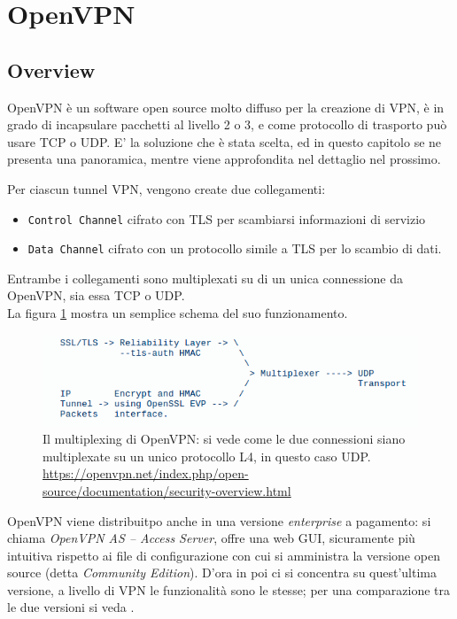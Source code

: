 \section{OpenVPN}
\subsection{Overview}
OpenVPN \cite{openvpn} è un software open source molto diffuso per la creazione di VPN,
è in grado di incapsulare pacchetti al livello 2 o 3, e come protocollo di trasporto
può usare TCP o UDP. E' la soluzione che è stata scelta, ed in questo capitolo
se ne presenta una panoramica, mentre viene approfondita nel dettaglio
nel prossimo.

Per ciascun tunnel VPN, vengono create due collegamenti:
\begin{itemize}
	\item \texttt{Control Channel} cifrato con TLS per scambiarsi informazioni di servizio
	\item \texttt{Data Channel} cifrato con un protocollo simile a TLS per lo scambio
	      di dati.
\end{itemize}
Entrambe i collegamenti sono multiplexati su di un unica connessione
da OpenVPN, sia essa TCP o UDP\cite{openvpn-security}.\\
La figura \ref{fig:openvpn-sec} mostra un semplice schema del suo funzionamento.\\
\begin{figure}[h!]
	\includegraphics[scale=0.4]{img/openvpn_sec}
	\caption[Il multiplexing di OpenVPN]{Il multiplexing di OpenVPN: si vede come
		le due connessioni siano multiplexate su un unico protocollo L4, in questo caso UDP.
		\url{https://openvpn.net/index.php/open-source/documentation/security-overview.html}}
	\label{fig:openvpn-sec}
\end{figure}
OpenVPN viene distribuitpo anche in una versione \textit{enterprise} a pagamento: si chiama
\textit{OpenVPN AS -- Access Server}, offre una web GUI, sicuramente più intuitiva
rispetto ai file di configurazione con cui si amministra la versione open source
(detta \textit{Community Edition})\cite{openvpn-intro}. D'ora in poi ci si concentra su quest'ultima
versione, a livello di VPN le funzionalità sono le stesse; per una comparazione tra
le due versioni si veda
\cite{openvpn-comparison}.

